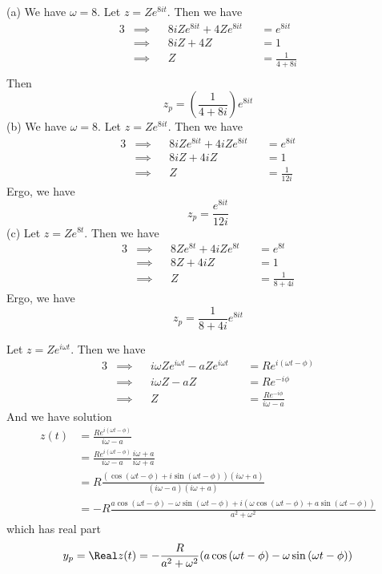 \documentclass[a4paper]{article}
\begin{document}
(a) We have \(\omega = 8\). Let \(z = Ze^{8it}\). Then we have
\begin{alignat*}{3}
	&\implies && 8iZe^{8it } + 4Ze^{8it } && = e^{8it } \\
	&\implies && 8iZ + 4Z && = 1 \\
	&\implies && Z && = \frac{1}{4 + 8i} \\ 
\end{alignat*}
Then
\[
	z_{p} = \!\left( \frac{1}{4 + 8i} \right) e^{8it }
\]
(b) We have \(\omega = 8\). Let \(z = Ze^{8it }\). Then we have
\begin{alignat*}{3}
	&\implies && 8iZe^{8it } + 4iZe^{8it} && = e^{8it } \\
	&\implies && 8iZ + 4iZ && = 1 \\ 
	&\implies && Z && = \frac{1}{12i}
\end{alignat*}
Ergo, we have
\[
	z_{p} = \frac{e^{8it }}{12i}
\]
(c) Let \(z = Ze^{8t}\). Then we have
\begin{alignat*}{3}
	&\implies && 8Ze^{8t} + 4iZe^{8t} && = e^{8t} \\
	&\implies && 8Z + 4iZ && = 1 \\ 
	&\implies && Z && = \frac{1}{8 + 4i}
\end{alignat*}
Ergo, we have
\[
	z_{p} = \frac{1}{8 + 4i} e^{8it}
\]


Let \(z = Ze^{i \omega t}\). Then we have
\begin{alignat*}{3}
	&\implies && i \omega Ze^{i \omega t} - aZe^{i \omega t} && = Re^{i \!\left( \omega t - \phi  \right) } \\
	&\implies && i \omega Z - aZ && = Re^{-i \phi } \\ 
	&\implies && Z && = \frac{Re^{-i \phi }}{i \omega - a}
\end{alignat*}
And we have solution
\begin{align*}
	z \!\left( t \right) & = \frac{Re^{i \!\left( \omega t - \phi  \right) }}{i \omega - a} \\
			     & = \frac{Re^{i \!\left( \omega t - \phi  \right) }}{i \omega - a} \frac{i \omega + a}{i \omega + a} \\
			     & = R \frac{\!\left(\cos\left( \omega t - \phi  \right) + i \sin\left( \omega t - \phi  \right)\right) \!\left( i \omega + a \right) }{\!\left( i \omega - a \right) \!\left( i \omega + a \right) } \\
			     & = -R \frac{a \cos\left( \omega t - \phi  \right) - \omega \sin\left( \omega t - \phi  \right) + i \!\left( \omega \cos\left( \omega t - \phi  \right) + a \sin\left( \omega t - \phi  \right) \right) }{a^{2} + \omega^{2} }
\end{align*}
which has real part
\[
	y_{p} = \Real z \!\left( t \right) = -\frac{R}{a^{2} + \omega^{2}} \!\left( a \cos\left( \omega t - \phi  \right) - \omega \sin\left( \omega t - \phi  \right) \right) 
\]
\end{document}
